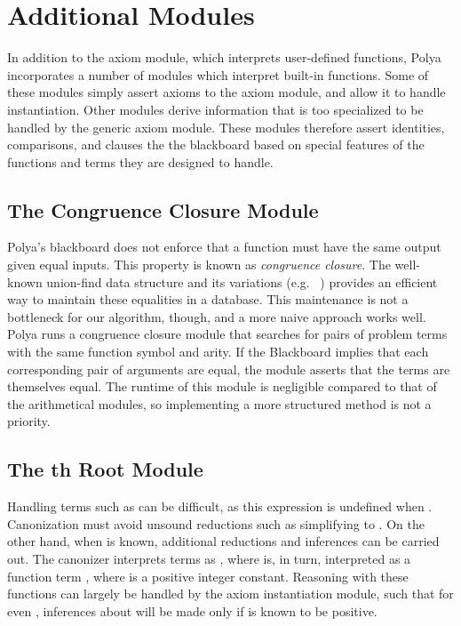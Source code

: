 \documentclass[runningheds]{llncs}
\begin{document}
\section{Additional Modules}
\label{section:other:modules}

In addition to the axiom module, which interprets user-defined functions, Polya incorporates a number of modules which interpret built-in functions. Some of these modules simply assert axioms to the axiom module, and allow it to handle instantiation. Other modules derive information that is too specialized to be handled by the generic axiom module. These modules therefore assert identities, comparisons, and clauses the the blackboard based on special features of the functions and terms they are designed to handle. 

\subsection{The Congruence Closure Module}
Polya's blackboard does not enforce that a function must have the same output given equal inputs. This property is known as \emph{congruence closure}. The well-known union-find data structure and its variations (e.g.\ \cite{demoura:bjorner:07} \cite{Moskal2008}) provides an efficient way to maintain these equalities in a database. This maintenance is not a bottleneck for our algorithm, though, and a more naive approach works well. Polya runs a congruence closure module that searches for pairs of problem terms with the same function symbol and arity. If the Blackboard implies that each corresponding pair of arguments are equal, the module asserts that the terms are themselves equal. The runtime of this module is negligible compared to that of the arithmetical modules, so implementing a more structured method is not a priority.

\subsection{The th Root Module}
Handling terms such as  can be difficult, as this expression is undefined when . Canonization must avoid unsound reductions such as simplifying  to . On the other hand, when  is known, additional reductions and inferences can be carried out. The canonizer interprets terms  as , where  is, in turn, interpreted as a function term , where  is a positive integer constant. Reasoning with these functions can largely be handled by the axiom instantiation module, such that for even , inferences about  will be made only if  is known to be positive.
\end{document}
